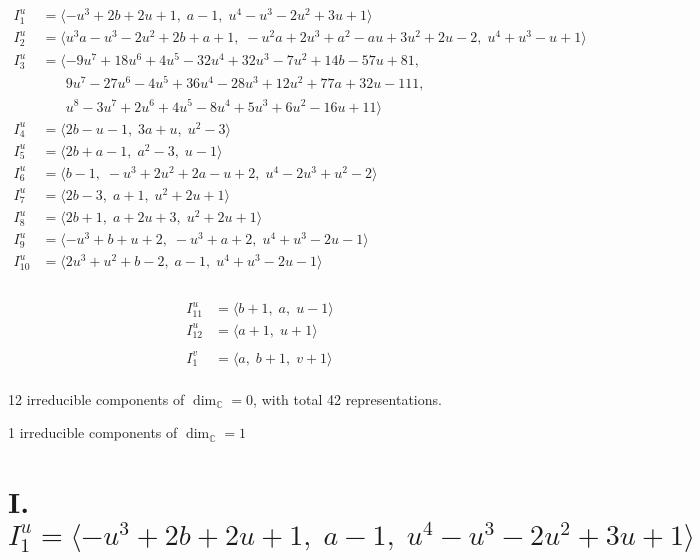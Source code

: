 \documentclass[1p]{elsarticle_modified}
\theoremstyle{definition}
\begin{document}
\begin{align*}
I^u_{1}&=\langle 
- u^3+2 b+2 u+1,\;a-1,\;u^4- u^3-2 u^2+3 u+1\rangle \\
I^u_{2}&=\langle 
u^3 a- u^3-2 u^2+2 b+a+1,\;- u^2 a+2 u^3+a^2- a u+3 u^2+2 u-2,\;u^4+u^3- u+1\rangle \\
I^u_{3}&=\langle 
-9 u^7+18 u^6+4 u^5-32 u^4+32 u^3-7 u^2+14 b-57 u+81,\\
\phantom{I^u_{3}}&\phantom{= \langle  }9 u^7-27 u^6-4 u^5+36 u^4-28 u^3+12 u^2+77 a+32 u-111,\\
\phantom{I^u_{3}}&\phantom{= \langle  }u^8-3 u^7+2 u^6+4 u^5-8 u^4+5 u^3+6 u^2-16 u+11\rangle \\
I^u_{4}&=\langle 
2 b- u-1,\;3 a+u,\;u^2-3\rangle \\
I^u_{5}&=\langle 
2 b+a-1,\;a^2-3,\;u-1\rangle \\
I^u_{6}&=\langle 
b-1,\;- u^3+2 u^2+2 a- u+2,\;u^4-2 u^3+u^2-2\rangle \\
I^u_{7}&=\langle 
2 b-3,\;a+1,\;u^2+2 u+1\rangle \\
I^u_{8}&=\langle 
2 b+1,\;a+2 u+3,\;u^2+2 u+1\rangle \\
I^u_{9}&=\langle 
- u^3+b+u+2,\;- u^3+a+2,\;u^4+u^3-2 u-1\rangle \\
I^u_{10}&=\langle 
2 u^3+u^2+b-2,\;a-1,\;u^4+u^3-2 u-1\rangle \\
\end{align*}\\
\begin{align*}
I^u_{11}&=\langle 
b+1,\;a,\;u-1\rangle \\
I^u_{12}&=\langle 
a+1,\;u+1\rangle \\
\\
I^v_{1}&=\langle 
a,\;b+1,\;v+1\rangle \\
\end{align*}
\raggedright * 12 irreducible components of $\dim_{\mathbb{C}}=0$, with total 42 representations.\\
\raggedright * 1 irreducible components of $\dim_{\mathbb{C}}=1$ \\
\newpage
\renewcommand{\arraystretch}{1}
\centering \section*{I. $I^u_{1}= \langle - u^3+2 b+2 u+1,\;a-1,\;u^4- u^3-2 u^2+3 u+1 \rangle$}
\end{document}
